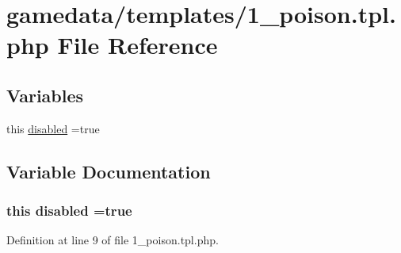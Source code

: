 \hypertarget{1__poison_8tpl_8php}{\section{gamedata/templates/1\+\_\+poison.tpl.\+php File Reference}
\label{1__poison_8tpl_8php}
}
\subsection*{Variables}
\begin{DoxyCompactItemize}
\item 
this \hyperlink{1__poison_8tpl_8php_a5954796dd8b0e54067ec29be2f8c5cf3}{disabled} =true
\end{DoxyCompactItemize}


\subsection{Variable Documentation}
\hypertarget{1__poison_8tpl_8php_a5954796dd8b0e54067ec29be2f8c5cf3}{
\subsubsection[{disabled}]{\setlength{\rightskip}{0pt plus 5cm}this disabled =true}}\label{1__poison_8tpl_8php_a5954796dd8b0e54067ec29be2f8c5cf3}


Definition at line 9 of file 1\+\_\+poison.\+tpl.\+php.

